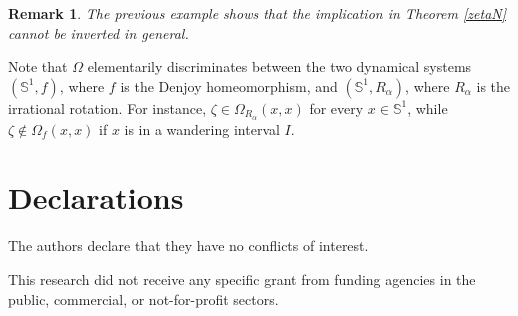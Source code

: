 \documentclass[10pt,a4paper]{article}
\theoremstyle{definition}
\theoremstyle{remark}
\theoremstyle{plain}
\newtheorem{rem}[defi]{Remark}
\begin{document}
\begin{rem}
The previous example shows that the implication in Theorem \ref{zetaN} cannot be inverted in general.
\end{rem}
\vspace{0.3cm}
Note that $\Omega$ elementarily discriminates between the two dynamical systems $(\mathbb S^1,f)$, where $f$ is the Denjoy homeomorphism, and $(\mathbb S^1,R_\alpha)$, where $R_\alpha$ is the irrational rotation. For instance, $\zeta\in\Omega_{R_\alpha} (x,x)$ for every $x\in\mathbb S^1$, while $\zeta\notin\Omega_f(x,x)$ if $x$ is in a wandering interval $I$.

\bigskip



 \section{Declarations}

 The authors declare that they have no conflicts of interest.

 This research did not receive any specific grant from funding agencies in the public, commercial, or not-for-profit sectors.

 
\end{document}
